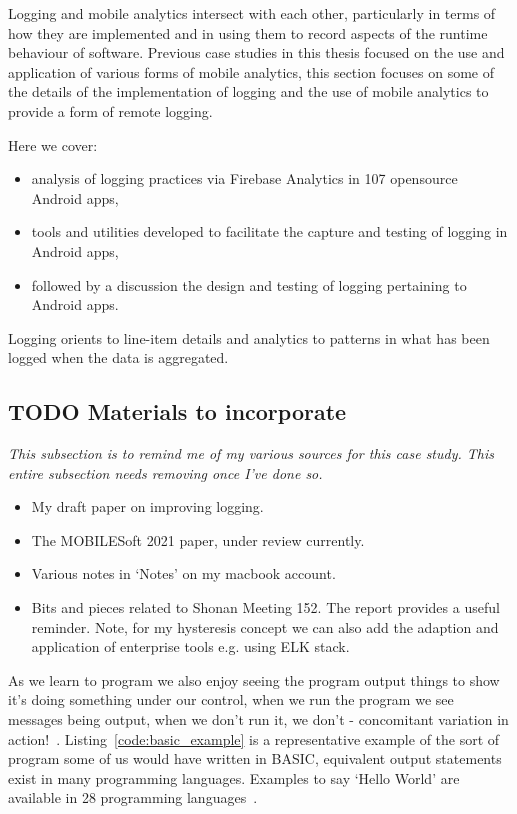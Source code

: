 Logging and mobile analytics intersect with each other, particularly in terms of how they are implemented and in using them to record aspects of the runtime behaviour of software. Previous case studies in this thesis focused on the use and application of various forms of mobile analytics, this section focuses on some of the details of the implementation of logging and the use of mobile analytics to provide a form of remote logging. 

Here we cover:
\begin{itemize}
    \item analysis of logging practices via Firebase Analytics in 107 opensource Android apps,
    \item tools and utilities developed to facilitate the capture and testing of logging in Android apps,
    \item followed by a discussion the design and testing of logging pertaining to Android apps.
\end{itemize}

Logging orients to line-item details and analytics to patterns in what has been logged when the data is aggregated.

\subsection{TODO Materials to incorporate}
\textit{This subsection is to remind me of my various sources for this case study. This entire subsection needs removing once I've done so.}
\begin{itemize}
    \item My draft paper on improving logging.
    \item The MOBILESoft 2021 paper, under review currently.
    \item Various notes in `Notes' on my macbook account.
    \item Bits and pieces related to Shonan Meeting 152. The report provides a useful reminder. Note, for my hysteresis concept we can also add the adaption and application of enterprise tools e.g. using ELK stack.  
\end{itemize}


As we learn to program we also enjoy seeing the program output things to show it's doing something under our control, when we run the program we see messages being output, when we don't run it, we don't - concomitant variation in action!~\citep{mill1884system}. Listing~\ref{code:basic_example} is a representative example of the sort of program some of us would have written in BASIC, equivalent output statements exist in many programming languages. Examples to say `Hello World' are available in 28 programming languages~\citep{helloworld2017}. 

